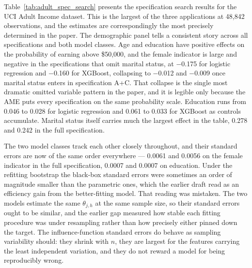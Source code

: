 \documentclass[12pt,a4paper]{article}
\numberwithin{equation}{section}
\theoremstyle{plain}
\theoremstyle{definition}
\begin{document}
	Table~\ref{tab:adult_spec_search} presents the specification search results for the UCI Adult Income dataset. This is the largest of the three applications at 48,842 observations, and the estimates are correspondingly the most precisely determined in the paper. The demographic panel tells a consistent story across all specifications and both model classes. Age and education have positive effects on the probability of earning above \$50,000, and the female indicator is large and negative in the specifications that omit marital status, at $-$0.175 for logistic regression and $-$0.160 for XGBoost, collapsing to $-$0.012 and $-$0.009 once marital status enters in specification A+C. That collapse is the single most dramatic omitted variable pattern in the paper, and it is legible only because the AME puts every specification on the same probability scale. Education runs from 0.046 to 0.028 for logistic regression and 0.061 to 0.033 for XGBoost as controls accumulate. Marital status itself carries much the largest effect in the table, 0.278 and 0.242 in the full specification.

	The two model classes track each other closely throughout, and their standard errors are now of the same order everywhere --- 0.0061 and 0.0056 on the female indicator in the full specification, 0.0007 and 0.0007 on education. Under the refitting bootstrap the black-box standard errors were sometimes an order of magnitude smaller than the parametric ones, which the earlier draft read as an efficiency gain from the better-fitting model. That reading was mistaken. The two models estimate the same $\theta_{j,h}$ at the same sample size, so their standard errors ought to be similar, and the earlier gap measured how stable each fitting procedure was under resampling rather than how precisely either pinned down the target. The influence-function standard errors do behave as sampling variability should: they shrink with $n$, they are largest for the features carrying the least independent variation, and they do not reward a model for being reproducibly wrong.
\end{document}

